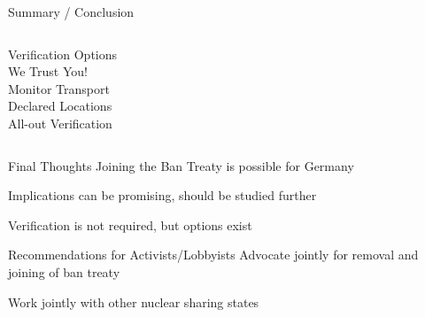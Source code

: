 \documentclass[presentation]{beamer}
\begin{document}
\begin{frame}[label={sec:org801d08c}]{Summary / Conclusion}
\begin{columns}[T]
\begin{column}{0.3\columnwidth}
\begin{tcolorbox}
\centering

\scriptsize
     Verification Options\\[0.8em]
 \tinyscriptsize
     We Trust You!\\[0.2em]
     Monitor Transport\\[0.2em]
     Declared Locations\\[0.2em]
     All-out Verification\\[0.2em]
\end{tcolorbox}
\end{column}
\end{columns}

\pause
\vspace{0.5cm}

\begin{block}{Final Thoughts}
Joining the Ban Treaty is possible for Germany

Implications can be promising, should be studied further

Verification is not required, but options exist
\end{block}

\begin{block}{Recommendations for Activists/Lobbyists}
Advocate jointly for removal and joining of ban treaty

Work jointly with other nuclear sharing states
\end{block}

\end{frame}
\end{document}
